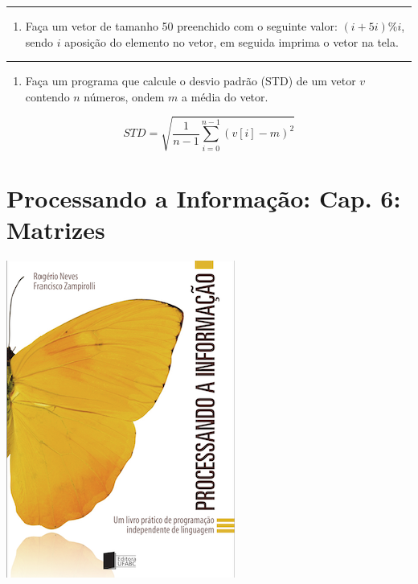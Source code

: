 \documentclass[12pt,a4paper]{article}
\providecommand{\tightlist}{%
      \setlength{\itemsep}{0pt}\setlength{\parskip}{0pt}}
\begin{document}
    \begin{center}\rule{0.5\linewidth}{0.5pt}\end{center}

\begin{enumerate}
\def\labelenumi{\arabic{enumi}.}
\setcounter{enumi}{33}
\tightlist
\item
  Faça um vetor de tamanho 50 preenchido com o seguinte valor:
  \((i+5i)\%i\), sendo \(i\) aposição do elemento no vetor, em seguida
  imprima o vetor na tela.
\end{enumerate}

    \begin{center}\rule{0.5\linewidth}{0.5pt}\end{center}

\begin{enumerate}
\def\labelenumi{\arabic{enumi}.}
\setcounter{enumi}{34}
\tightlist
\item
  Faça um programa que calcule o desvio padrão (STD) de um vetor \(v\)
  contendo \(n\) números, ondem \(m\) a média do vetor.
\end{enumerate}

\[ STD = \sqrt{\frac{1}{n-1} \sum_{i=0}^{n-1}(v[i]-m)^2} \]

    \hypertarget{processando-a-informauxe7uxe3o-cap.-6-matrizes}{%
\section{Processando a Informação: Cap. 6:
Matrizes}\label{processando-a-informauxe7uxe3o-cap.-6-matrizes}}

    \includegraphics{"figs/Capa_Processando_Informacao.jpg"}
\end{document}
